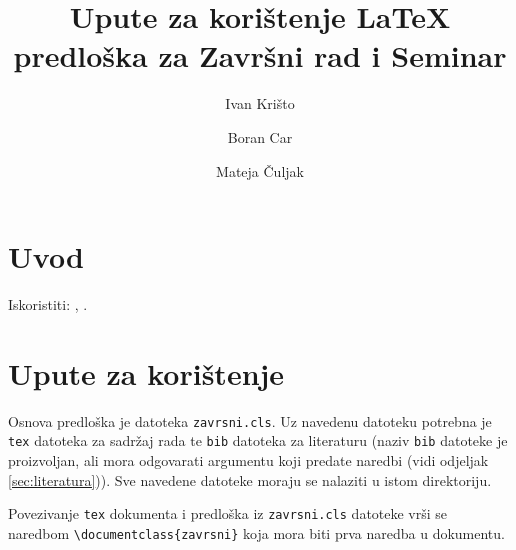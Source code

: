 \documentclass{zavrsni}
\begin{document}
\title{Upute za korištenje \LaTeX{} predloška za Završni rad i Seminar}
\author{Ivan Krišto \and Boran Car \and Mateja Čuljak}

\maketitle

\tableofcontents

\chapter{Uvod}



Iskoristiti: \citep{taraborelli2009beauty}, \citep{cottrell1999word}.

\chapter{Upute za korištenje}
\label{ch:upute}
Osnova predloška je datoteka \texttt{zavrsni.cls}. Uz navedenu datoteku potrebna
je \texttt{tex} datoteka za sadržaj rada te \texttt{bib} datoteka za literaturu
(naziv \texttt{bib} datoteke je proizvoljan, ali mora odgovarati argumentu koji
predate naredbi \verb|| (vidi odjeljak \ref{sec:literatura})). Sve
navedene datoteke moraju se nalaziti u istom direktoriju.

Povezivanje \texttt{tex} dokumenta i predloška iz \texttt{zavrsni.cls}
datoteke vrši se naredbom \verb|\documentclass{zavrsni}| koja mora biti prva
naredba u dokumentu.
\end{document}
